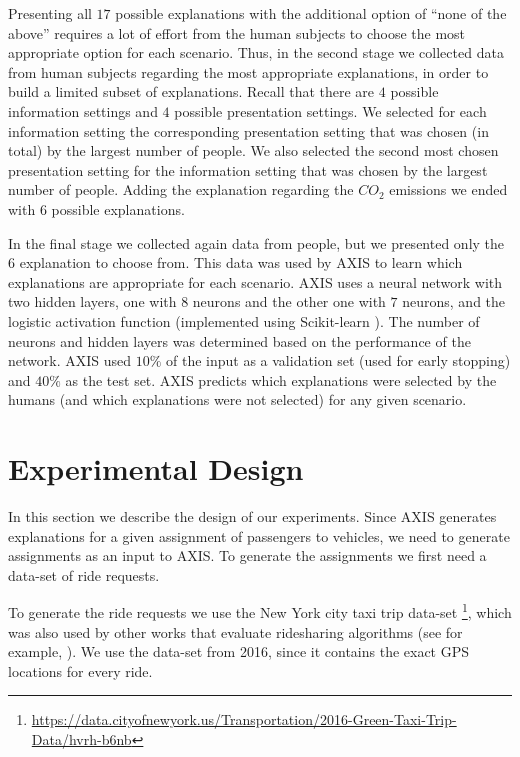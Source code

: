 \documentclass[letterpaper]{article} %
\begin{document}
Presenting all $17$ possible explanations with the additional option of ``none of the above'' requires a lot of effort from the human subjects to choose the most appropriate option for each scenario. Thus, in the second stage we collected data from human subjects regarding the most appropriate explanations, in order to build a limited subset of explanations. Recall that there are $4$ possible information settings and $4$ possible presentation settings. We selected for each information setting the corresponding presentation setting that was chosen (in total) by the largest number of people. We also selected the second most chosen presentation setting for the information setting that was chosen by the largest number of people. Adding the explanation regarding the $CO_2$ emissions we ended with $6$ possible explanations.

In the final stage we collected again data from people, but we presented only the $6$ explanation to choose from. This data was used by AXIS to learn which explanations are appropriate for each scenario. AXIS uses a neural network with two hidden layers, one with $8$ neurons and the other one with $7$ neurons, and the logistic activation function (implemented using Scikit-learn \cite{scikit-learn}). The number of neurons and hidden layers was determined based on the performance of the network.
AXIS used $10\%$ of the input as a validation set (used for early stopping) and $40\%$ as the test set. AXIS predicts which explanations were selected by the humans (and which explanations were not selected) for any given scenario. 



\section{Experimental Design}
In this section we describe the design of our experiments. Since AXIS generates explanations for a given assignment of passengers to vehicles, we need to generate assignments as an input to AXIS. To generate the assignments we first need a data-set of ride requests.

To generate the ride requests we use the New York city taxi trip data-set \footnote{\url{https://data.cityofnewyork.us/Transportation/2016-Green-Taxi-Trip-Data/hvrh-b6nb}}, which was also used by other works that evaluate ridesharing algorithms (see for example, \cite{lin2016model,biswas2017profit}). We use the data-set from 2016, since it contains the exact GPS locations for every ride. %
\end{document}
